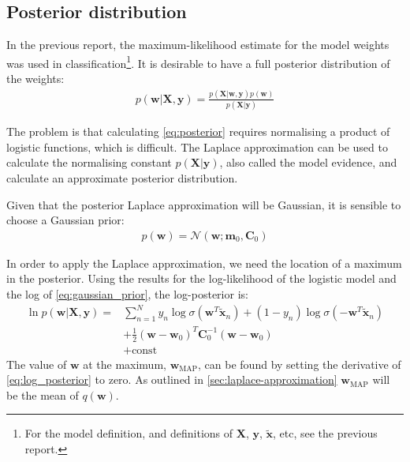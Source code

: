 \documentclass[a4paper]{article}
\begin{document}
    \subsection{Posterior distribution}
    In the previous report, the maximum-likelihood estimate for the model weights was used in classification\footnote{For the model definition, and definitions of $\bm{X}$, $\bm{y}$, $\tilde{\bm{x}}$, etc, see the previous report.}.
    It is desirable to have a full posterior distribution of the weights:
    \begin{align}
        p(\bm{w} | \bm{X}, \bm{y}) = \frac{p(\bm{X} | \bm{w}, \bm{y}) p(\bm w)}{p(\bm{X} | \bm{y})}
        \label{eq:posterior}
    \end{align}

    The problem is that calculating \autoref{eq:posterior} requires normalising a product of logistic functions, which
    is difficult. The Laplace approximation can be used to calculate the normalising constant $p(\bm{X} | \bm{y})$,
    also called the model evidence, and calculate an approximate posterior distribution.

    Given that the posterior Laplace approximation will be Gaussian, it is sensible to choose a Gaussian prior:
    \begin{align}
        p(\bm{w}) = \mathcal{N}(\bm{w}; \bm{m}_0, \bm{C}_0)
        \label{eq:gaussian_prior}
    \end{align}

    In order to apply the Laplace approximation, we need the location of a maximum in the posterior. Using the results
    for the log-likelihood of the logistic model and the log of \autoref{eq:gaussian_prior}, the log-posterior is:
    \begin{align}
        \ln p(\bm{w} | \bm{X}, \bm{y}) =
        & \sum_{n=1}^{N} y_n \log\sigma( \bm{w}^T \tilde{\bm{x}}_n) + (1-y_n) \log\sigma(-\bm{w}^T \tilde{\bm{x}}_n) \nonumber \\
        & + \frac{1}{2} (\bm{w} - \bm{w}_0)^T \bm{C}_0^{-1} (\bm{w} - \bm{w}_0) \nonumber \\
        & + \text{const}
        \label{eq:log_posterior}
    \end{align}
    The value of $\bm{w}$ at the maximum, $\bm{w}_{\text{MAP}}$, can be found by setting the derivative of
    \autoref{eq:log_posterior} to zero. As outlined in \autoref{sec:laplace-approximation} $\bm{w}_{\text{MAP}}$ will
    be the mean of $q(\bm{w})$.
\end{document}
